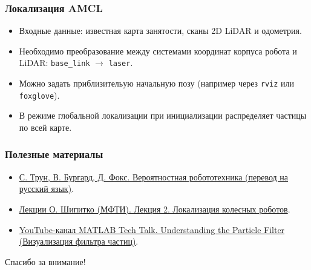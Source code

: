 \documentclass[aspectratio=169]{beamer}
\newcommand{\cmd}[1]{\textcolor{HSEblue}{\texttt{#1}}}
\begin{document}
\begin{frame}
\frametitle{Локализация AMCL}
\small
\begin{itemize}
  \item Входные данные: известная карта занятости, сканы 2D LiDAR и одометрия.
  \item Необходимо преобразование между системами координат корпуса робота и LiDAR: \cmd{base\_link} $\to$ \cmd{laser}.
  \item Можно задать приблизительую начальную позу (например через \cmd{rviz} или \cmd{foxglove}).
  \item В режиме глобальной локализации при инициализации распределяет частицы по всей карте.
\end{itemize}
\end{frame}

\begin{frame}
\frametitle{Полезные материалы}
\small
\begin{itemize}

  \item  
  \href{https://github.com/literator1996/veroyatnostnaya_robototehnica/tree/master}{С. Трун, В. Бургард, Д. Фокс. Вероятностная робототехника (перевод на русский язык)}.
  \item\href{https://github.com/oleg-Shipitko/mipt_wheeled_robots_modeling_2022/blob/main/slides/Lecture\%202.\%20Localization.pdf}{Лекции О. Шипитко (МФТИ). Лекция 2. Локализация колесных роботов}.  
  \item \href{https://www.youtube.com/watch?v=NrzmH_yerBU&t=22s}{YouTube-канал MATLAB Tech Talk.  Understanding the Particle Filter (Визуализация фильтра частиц)}.
\end{itemize}
\end{frame}

\begin{frame}
\begin{center}
\Large Спасибо за внимание!
\end{center}
\vfill
\end{frame}
\end{document}
